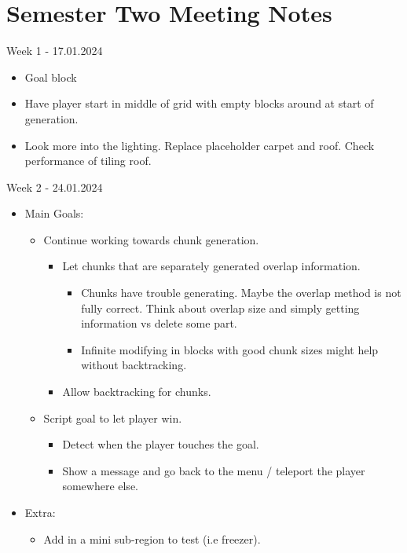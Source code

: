 \section{Semester Two Meeting Notes}
\label{sec:semester_two_meeting_notes}
\noindent Week 1 - 17.01.2024
\begin{itemize}
    \item Goal block
    \item Have player start in middle of grid with empty blocks around at start of generation.
    \item Look more into the lighting. Replace placeholder carpet and roof. Check performance of tiling roof.
\end{itemize}

\noindent Week 2 - 24.01.2024
\begin{itemize}
    \item Main Goals:
    \begin{itemize}
        \item Continue working towards chunk generation.
        \begin{itemize}
            \item Let chunks that are separately generated overlap information.
            \begin{itemize}
                \item Chunks have trouble generating. Maybe the overlap method is not fully correct. Think about overlap size and simply getting information vs delete some part.
                \item Infinite modifying in blocks with good chunk sizes might help without backtracking.
            \end{itemize}
            \item Allow backtracking for chunks.
        \end{itemize}
        \item Script goal to let player win.
        \begin{itemize}
            \item Detect when the player touches the goal.
            \item Show a message and go back to the menu / teleport the player somewhere else.
        \end{itemize}
    \end{itemize}
    \item Extra:
    \begin{itemize}
        \item Add in a mini sub-region to test (i.e freezer).

\end{itemize}
\end{itemize}
